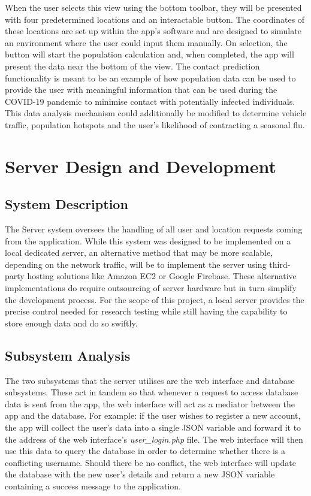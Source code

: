 When the user selects this view using the bottom toolbar, they will be presented with four predetermined locations and an interactable button. The coordinates of these locations are set up within the app's software and are designed to simulate an environment where the user could input them manually. On selection, the button will start the population calculation and, when completed, the app will present the data near the bottom of the view. The contact prediction functionality is meant to be an example of how population data can be used to provide the user with meaningful information that can be used during the COVID-19 pandemic to minimise contact with potentially infected individuals. This data analysis mechanism could additionally be modified to determine vehicle traffic, population hotspots and the user's likelihood of contracting a seasonal flu.

\section{Server Design and Development}

\subsection{System Description}
The Server system oversees the handling of all user and location requests coming from the application. While this system was designed to be implemented on a local dedicated server, an alternative method that may be more scalable, depending on the network traffic, will be to implement the server using third-party hosting solutions like Amazon EC2 or Google Firebase. These alternative implementations do require outsourcing of server hardware but in turn simplify the development process. For the scope of this project, a local server provides the precise control needed for research testing while still having the capability to store enough data and do so swiftly. 

\subsection{Subsystem Analysis}
The two subsystems that the server utilises are the web interface and database subsystems. These act in tandem so that whenever a request to access database data is sent from the app, the web interface will act as a mediator between the app and the database. For example: if the user wishes to register a new account, the app will collect the user's data into a single JSON variable and forward it to the address of the web interface's \textit{user\_login.php} file. The web interface will then use this data to query the database in order to determine whether there is a conflicting username. Should there be no conflict, the web interface will update the database with the new user's details and return a new JSON variable containing a success message to the application.

